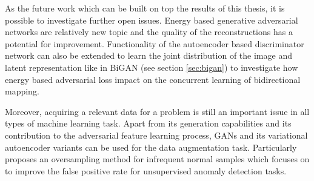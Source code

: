 As the future work which can be built on top the results of this thesis, it is possible to investigate 
further open issues. Energy based generative adversarial networks are relatively new topic and the 
quality of the reconstructions has a potential for improvement. Functionality of the autoencoder based 
discriminator network can also be extended to learn the joint distribution of the image and latent 
representation like in BiGAN (see section \ref{sec:bigan}) to investigate how energy based adversarial loss impact 
on the concurrent learning of bidirectional mapping. 

Moreover, acquiring a relevant data for a problem is still an important issue in all types of machine 
learning task. Apart from its generation capabilities and its contribution to the adversarial feature 
learning process, GANs and its variational autoencoder variants can be used for the data augmentation task.
Particularly \cite{DBLP:journals/corr/abs-1808-07632} proposes an oversampling method for infrequent normal samples 
which focuses on to improve the false positive rate for unsupervised anomaly detection tasks. 

\endgroup
 
